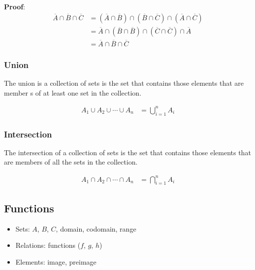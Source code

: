 \documentclass{article}
\begin{document}
\textbf{Proof}:
\begin{align*}
	\overline{A} \cap \overline{B} \cap \overline{C} & = \left( \overline{A} \cap \overline{B} \right) \cap \left( \overline{B} \cap \overline{C} \right) \cap \left( \overline{A} \cap \overline{C} \right) \\
	                                                 & = \overline{A} \cap \left( \overline{B} \cap \overline{B} \right) \cap \left( \overline{C} \cap \overline{C} \right) \cap \overline{A}                \\
	                                                 & = \overline{A} \cap \overline{B} \cap \overline{C}
\end{align*}

\subsubsection{Union}

The union is a collection of sets is the set that contains those elements that are member s of at least one set in the collection.

\begin{align*}
	A_1 \cup A_2 \cup \cdots \cup A_n & = \bigcup_{ i = 1 }^{ n } A_i
\end{align*}

\subsubsection{Intersection}

The intersection of a collection of sets is the set that contains those elements that are members of all the sets in the collection.

\begin{align*}
	A_1 \cap A_2 \cap \cdots \cap A_n & = \bigcap_{ i = 1 }^{ n } A_i
\end{align*}

\subsection{Functions}

\begin{itemize}
	\item Sets: $ A $, $ B $, $ C $, domain, codomain, range

	\item Relations: functions ($ f $, $ g $, $ h $)

	\item Elements: image, preimage
\end{itemize}
\end{document}
